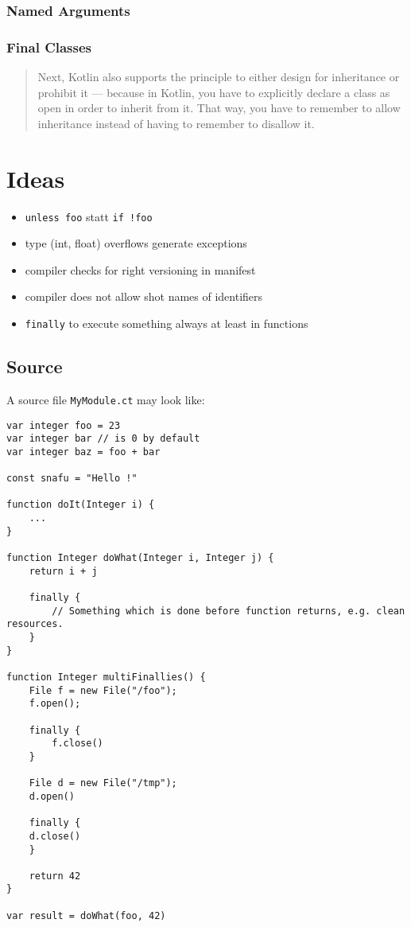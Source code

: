 \documentclass[a4paper,12pt]{report}
\begin{document}
\subsection{Named Arguments}

\subsection{Final Classes}

\begin{quotation}
Next, Kotlin also supports the principle to either design for inheritance or prohibit it — because in Kotlin, you have to explicitly declare a class as open in order to inherit from it. That way, you have to remember to allow inheritance instead of having to remember to disallow it.\cite{kotlin-sommerhoff}
\end{quotation}

\chapter{Ideas}

\begin{itemize}
    \item \verb|unless foo| statt \verb|if !foo|
    \item type (int, float) overflows generate exceptions
    \item compiler checks for right versioning in manifest
    \item compiler does not allow shot names of identifiers
    \item \verb|finally| to execute something always at least in functions
\end{itemize}

\section{Source}

A source file \verb|MyModule.ct| may look like:

\begin{verbatim}
var integer foo = 23
var integer bar // is 0 by default
var integer baz = foo + bar

const snafu = "Hello !"

function doIt(Integer i) {
    ...
}

function Integer doWhat(Integer i, Integer j) {
    return i + j
    
    finally {
    	// Something which is done before function returns, e.g. clean resources.
    }
}

function Integer multiFinallies() {
    File f = new File("/foo");
    f.open();
    
    finally {
        f.close()
    }
    
    File d = new File("/tmp");
    d.open()
    
    finally {
    d.close()
    }
    
    return 42
}

var result = doWhat(foo, 42)	
\end{verbatim}
\end{document}

